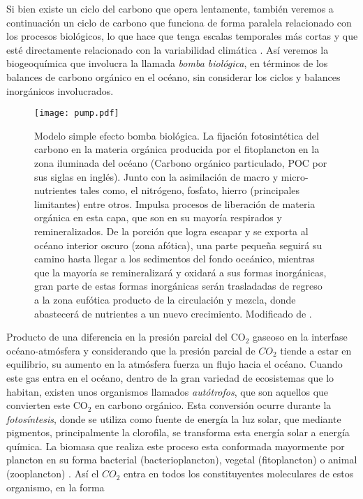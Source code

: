 Si bien existe un ciclo del carbono que opera lentamente, también veremos a continuación un ciclo de carbono que funciona de forma paralela relacionado con los procesos biológicos, lo que hace que tenga escalas temporales más cortas y que esté directamente relacionado con la variabilidad climática \citep{sigman2003biological}. Así veremos la biogeoquímica que involucra la llamada \textit{bomba biológica}, en términos de los balances de carbono orgánico en el océano, sin considerar los ciclos y balances inorg\'anicos involucrados. \newpage

\begin{figure}[H]
\centering
 \texttt{[image: pump.pdf]}
 \caption[Modelo simple efecto bomba biológica]{Modelo simple efecto bomba biológica. La fijación fotosintética del carbono en la materia orgánica producida por el fitoplancton en la zona iluminada del océano (Carbono orgánico particulado, POC por sus siglas en inglés). Junto con la asimilación de macro y micro-nutrientes tales como, el nitrógeno, fosfato, hierro (principales limitantes) entre otros. Impulsa procesos de liberación de materia orgánica en esta capa, que son en su mayoría respirados y remineralizados. De la porción que logra escapar y se exporta al océano interior oscuro (zona afótica), una parte pequeña seguirá su camino hasta llegar a los sedimentos del fondo oceánico, mientras que la mayoría se remineralizará y oxidará a sus formas inorgánicas, gran parte de estas formas inorgánicas serán trasladadas de regreso a la zona eufótica producto de la circulación y mezcla, donde abastecerá de nutrientes a un nuevo crecimiento. Modificado de \citep{herndl2013microbial}.}
  \label{fig:bio1}
\end{figure} 

Producto de una diferencia en la presi\'on parcial del CO$_2$ gaseoso en la interfase oc\'eano-atm\'osfera y considerando que la presi\'on parcial de $CO_2$ tiende a estar en equilibrio, su aumento en la atm\'osfera fuerza un flujo hacia el oc\'eano. Cuando este gas entra en el océano, dentro de la gran variedad de ecosistemas que lo habitan, existen unos organismos llamados \textit{autótrofos}, que son aquellos que convierten este CO$_2$ en carbono orgánico. Esta conversión ocurre durante la \textit{fotosíntesis}, donde se utiliza como fuente de energía la luz solar, que mediante pigmentos, principalmente la clorofila, se transforma esta energía solar a energía química. La biomasa que realiza este proceso esta conformada mayormente por plancton en su forma bacterial (bacterioplancton), vegetal (fitoplancton) o animal (zooplancton) \citep{jeandelmarine}. Así el $CO_2$ entra en todos los constituyentes moleculares de estos organismo, en la forma

